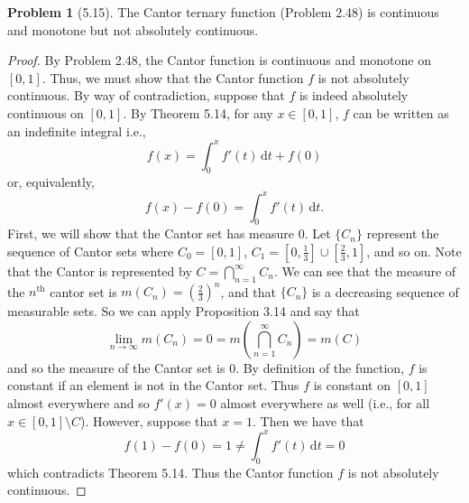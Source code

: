 \documentclass[12pt]{article}
\newcommand{\dif}{\, \mathrm{d}}
\theoremstyle{definition}
\newtheorem{problem}{Problem}
\begin{document}
\begin{problem}[5.15]

  The Cantor ternary function (Problem 2.48) is continuous and monotone but not absolutely continuous. 
    \begin{proof}
      By Problem 2.48, the Cantor function is continuous and monotone on \( [0,1] \).
      Thus, we must show that the Cantor function \( f \) is not absolutely continuous. 
      By way of contradiction, suppose that \( f \) is indeed absolutely continuous on \( [0,1] \).
      By Theorem 5.14, for any \( x \in [0,1] \), \( f \) can be written as an indefinite integral i.e.,
        \[
            f(x) = \int_{0}^{x} f'(t) \dif t + f(0)
        \]
      or, equivalently,
        \[
          f(x) - f(0) = \int_{0}^{x} f'(t) \dif t.
        \]
      First, we will show that the Cantor set has measure \( 0 \). 
      Let \( \{C_n\} \) represent the sequence of Cantor sets where \( \displaystyle C_0 = [0,1] \), \( \displaystyle C_1 = \left[ 0, \frac{1}{3} \right] \cup \left[ \frac{2}{3}, 1 \right] \), and so on. 
      Note that the Cantor is represented by \( \displaystyle C = \bigcap_{n=1}^{\infty} C_n \).
      We can see that the measure of the \( n^{\text{th}} \) cantor set is \( \displaystyle m \left(C_n\right) = \left( \frac{2}{3} \right)^{n} \), and that \( \{C_n\} \) is a decreasing sequence of measurable sets.
       So we can apply Proposition 3.14 and say that 
        \[
              \lim_{n \to \infty} m(C_n) = 0 = m \left( \bigcap_{n=1}^{\infty} C_n \right) = m(C)
        \]
      and so the measure of the Cantor set is \( 0 \). By definition of the function, \( f \) is constant if an element is not in the Cantor set. 
      Thus \( f \) is constant on \( [0,1] \) almost everywhere and so \( f'(x) = 0 \) almost everywhere as well (i.e., for all \( x \in [0,1] \setminus C \)). However, suppose that \( x = 1 \). Then we have that 
        \[
          f(1) - f(0) = 1 \neq \int_{0}^{x} f'(t) \dif t = 0
        \]        
      which contradicts Theorem 5.14. Thus the Cantor function \( f \) is not absolutely continuous. 
    \end{proof}
\end{problem}
\end{document}
